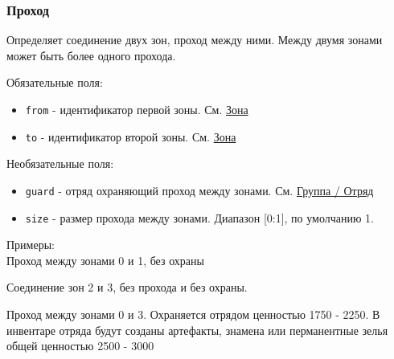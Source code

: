 \subsubsection{Проход}
\label{connection}
Определяет соединение двух зон, проход между ними.
Между двумя зонами может быть более одного прохода.

Обязательные поля:
\begin{itemize}
\item \texttt{from} - идентификатор первой зоны. См. \hyperref[zone]{Зона}
\item \texttt{to} - идентификатор второй зоны. См. \hyperref[zone]{Зона}
\end{itemize}

Необязательные поля:
\begin{itemize}
\item \texttt{guard} - отряд охраняющий проход между зонами. См. \hyperref[group]{Группа / Отряд}
\item \texttt{size} - размер прохода между зонами. Диапазон [0:1], по умолчанию 1.
\end{itemize}

Примеры:\\
Проход между зонами 0 и 1, без охраны
\begin{figure}[h]

\end{figure}

Соединение зон 2 и 3, без прохода и без охраны.
\begin{figure}[h]

\end{figure}

Проход между зонами 0 и 3.
Охраняется отрядом ценностью 1750 - 2250.
В инвентаре отряда будут созданы артефакты, знамена или перманентные зелья общей ценностью 2500 - 3000
\begin{figure}[h]

\end{figure}